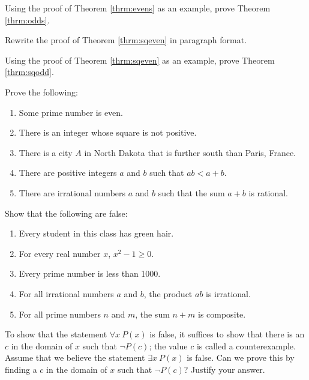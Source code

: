 \begin{exercise}
Using the proof of Theorem \ref{thrm:evens} as an example, prove Theorem \ref{thrm:odds}.
\end{exercise}

\begin{exercise}
Rewrite the proof of Theorem \ref{thrm:sqeven} in paragraph format.
\end{exercise}

\begin{exercise}
Using the proof of Theorem \ref{thrm:sqeven} as an example, prove Theorem \ref{thrm:sqodd}.
\end{exercise}

\begin{exercise} \label{exer:exist}
Prove the following:
\begin{enumerate}
\item Some prime number is even.
\item There is an integer whose square is not positive.
\item There is a city $A$ in North Dakota that is further south than Paris, France.
\item There are positive integers $a$ and $b$ such that $ab<a+b$.
\item There are irrational numbers $a$ and $b$ such that the sum $a+b$ is rational.
\end{enumerate}
\end{exercise}

\begin{exercise}\label{exer:forall}
Show that the following are false:
\begin{enumerate}
\item Every student in this class has green hair.
\item For every real number $x$, $x^2-1\geq0$.
\item Every prime number is less than 1000.
\item  For all irrational numbers $a$ and $b$, the product $ab$ is irrational.
\item For all prime numbers $n$ and $m$, the sum $n+m$ is composite.
\end{enumerate}
\end{exercise}

\begin{exercise}
To show that the statement $\forall x\ P(x)$ is false, it suffices to show that there is an $c$ in the domain of $x$ such that $\neg P(c)$; the value $c$ is called a counterexample. Assume that we believe the statement $\exists x\ P(x)$ is false. Can we prove this by finding a $c$ in the domain of $x$ such that $\neg P(c)$? Justify your answer. 
\end{exercise}


